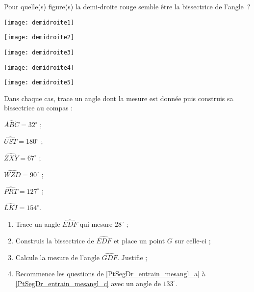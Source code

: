
\begin{exercice}[Reconnaître]
Pour quelle(s) figure(s) la demi‑droite rouge semble être la bissectrice de l'angle ?
\begin{colenumerate}{3}
 \item  
 
 \texttt{[image: demidroite1]}
 \item 
 
 \texttt{[image: demidroite2]}
 \item 
 
 \texttt{[image: demidroite3]}
 \item 
 
 \texttt{[image: demidroite4]}
 \item
 
 \texttt{[image: demidroite5]}

 \end{colenumerate}
\end{exercice} 


\begin{exercice}
Dans chaque cas, trace un angle dont la mesure est donnée puis construis sa bissectrice au compas :
\begin{colenumerate}{3}
 \item $\widehat{ABC} = 32^\circ$ ;
  \item $\widehat{UST} = 180^\circ$ ; 
  \item $\widehat{ZXY} = 67^\circ$ ;
  \item $\widehat{WZD} = 90^\circ$ ;
  \item $\widehat{PRT} = 127^\circ$ ;
  \item $\widehat{LKI} = 154^\circ$.
 \end{colenumerate}
\end{exercice} 


\begin{exercice}
\begin{enumerate}
 \item Trace un angle $\widehat{EDF}$ qui mesure $28^\circ$ ; \label{PtSegDr_entrain_mesangl_a}
 \item Construis la bissectrice de $\widehat{EDF}$ et place un point $G$ sur celle‑ci ;
 \item Calcule la mesure de l'angle $\widehat{GDF}$. Justifie ; \label{PtSegDr_entrain_mesangl_c}
 \item Recommence les questions de \ref{PtSegDr_entrain_mesangl_a} à \ref{PtSegDr_entrain_mesangl_c} avec un angle de $133^\circ$.
 \end{enumerate}
\end{exercice} 
